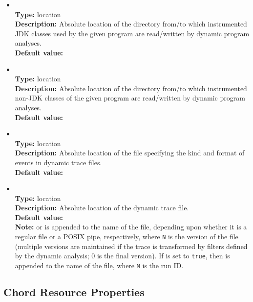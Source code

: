 \begin{itemize}
\item
{} \\
{\bf Type:} location \\
{\bf Description:} Absolute location of the directory from/to which instrumented JDK classes used by the given program are read/written by dynamic program analyses. \\
{\bf Default value:}  

\item
{} \\
{\bf Type:} location \\
{\bf Description:} Absolute location of the directory from/to which instrumented non-JDK classes of the given program are read/written by dynamic program analyses. \\
{\bf Default value:}  

\item
{} \\
{\bf Type:} location \\
{\bf Description:} Absolute location of the file specifying the kind and format of events in dynamic trace files. \\
{\bf Default value:} 

\item
{} \\
{\bf Type:} location \\
{\bf Description:} Absolute location of the dynamic trace file. \\
{\bf Default value:}   \\
{\bf Note:}  or  is appended to the name of the file, depending upon whether it is a regular file or a POSIX pipe, respectively, where {\tt N} is the version of the file (multiple versions are maintained if the trace is transformed by filters defined by the dynamic analysis; 0 is the final version).  If  is set to {\tt true}, then  is appended to the name of the file, where {\tt M} is the run ID.
\end{itemize}

\subsection{Chord Resource Properties}
\label{sec:chord-sysprops:resource}


